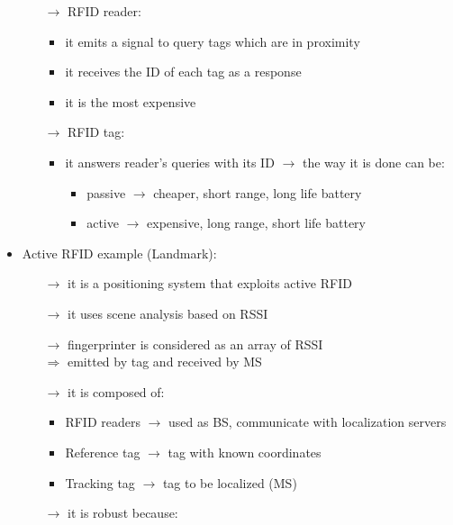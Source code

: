 \begin{itemize}
\begin{itemize}
        \item[$\rightarrow$] RFID reader:
        \begin{itemize}
            \item it emits a signal to query tags which are in proximity
            \item it receives the ID of each tag as a response
            \item it is the most expensive
        \end{itemize}
        \item[$\rightarrow$] RFID tag:
        \begin{itemize}
            \item it answers reader's queries with its ID $\rightarrow$ the way it is done can be:
            \begin{itemize}
                \item passive $\rightarrow$ cheaper, short range, long life battery
                \item active $\rightarrow$ expensive, long range, short life battery
            \end{itemize}
        \end{itemize}
    \end{itemize}
    \item Active RFID example (Landmark):
    \begin{itemize}
        \item[$\rightarrow$] it is a positioning system that exploits active RFID
        \item[$\rightarrow$] it uses scene analysis based on RSSI
        \item[$\rightarrow$] fingerprinter is considered as an array of RSSI\\
        $\Rightarrow$ emitted by tag and received by MS
        \item[$\rightarrow$] it is composed of:
        \begin{itemize}
            \item RFID readers $\rightarrow$ used as BS, communicate with localization servers
            \item Reference tag $\rightarrow$ tag with known coordinates
            \item Tracking tag $\rightarrow$ tag to be localized (MS)
        \end{itemize}
        \item[$\rightarrow$] it is robust because:
        \begin{itemize}

\end{itemize}
\end{itemize}
\end{itemize}
